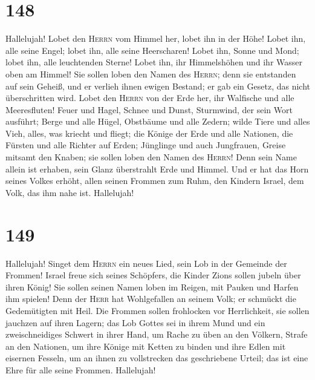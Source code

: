 \hypertarget{section-147}{%
\section{148}\label{section-147}}

 Hallelujah! Lobet den \textsc{Herrn} vom Himmel her,
lobet ihn in der Höhe!  Lobet ihn, alle seine Engel; lobet
ihn, alle seine Heerscharen!  Lobet ihn, Sonne und Mond;
lobet ihn, alle leuchtenden Sterne!  Lobet ihn, ihr
Himmelshöhen und ihr Wasser oben am Himmel!  Sie sollen
loben den Namen des \textsc{Herrn}; denn sie entstanden auf sein Geheiß,
 und er verlieh ihnen ewigen Bestand; er gab ein Gesetz,
das nicht überschritten wird.  Lobet den \textsc{Herrn}
von der Erde her, ihr Walfische und alle Meeresfluten! 
Feuer und Hagel, Schnee und Dunst, Sturmwind, der sein Wort ausführt;
 Berge und alle Hügel, Obstbäume und alle Zedern;
 wilde Tiere und alles Vieh, alles, was kriecht und
fliegt;  die Könige der Erde und alle Nationen, die
Fürsten und alle Richter auf Erden;  Jünglinge und auch
Jungfrauen, Greise mitsamt den Knaben;  sie sollen loben
den Namen des \textsc{Herrn}! Denn sein Name allein ist erhaben, sein
Glanz überstrahlt Erde und Himmel.  Und er hat das Horn
seines Volkes erhöht, allen seinen Frommen zum Ruhm, den Kindern Israel,
dem Volk, das ihm nahe ist. Hallelujah!

\hypertarget{section-148}{%
\section{149}\label{section-148}}

 Hallelujah! Singet dem \textsc{Herrn} ein neues Lied,
sein Lob in der Gemeinde der Frommen!  Israel freue sich
seines Schöpfers, die Kinder Zions sollen jubeln über ihren König!
 Sie sollen seinen Namen loben im Reigen, mit Pauken und
Harfen ihm spielen!  Denn der \textsc{Herr} hat
Wohlgefallen an seinem Volk; er schmückt die Gedemütigten mit Heil.
 Die Frommen sollen frohlocken vor Herrlichkeit, sie
sollen jauchzen auf ihren Lagern;  das Lob Gottes sei in
ihrem Mund und ein zweischneidiges Schwert in ihrer Hand, 
um Rache zu üben an den Völkern, Strafe an den Nationen, 
um ihre Könige mit Ketten zu binden und ihre Edlen mit eisernen Fesseln,
 um an ihnen zu vollstrecken das geschriebene Urteil; das
ist eine Ehre für alle seine Frommen. Hallelujah!

